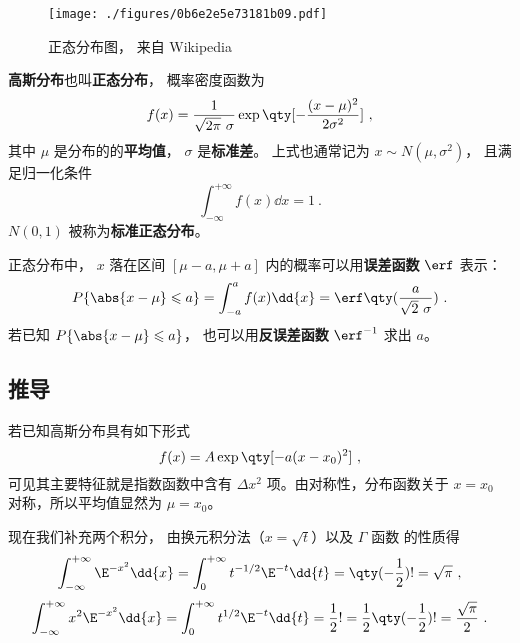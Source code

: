 
\begin{issues}
\issueTODO
\end{issues}


\begin{figure}[ht]
\centering
\texttt{[image: ./figures/0b6e2e5e73181b09.pdf]}
\caption{正态分布图， 来自 Wikipedia} \label{fig_GausPD_1}
\end{figure}

\textbf{高斯分布}也叫\textbf{正态分布}， 概率密度函数为
\begin{equation}\label{eq_GausPD_1}
f(x) = \frac{1}{\sqrt{2\pi}\ \sigma} \exp\qty[-\frac{(x - \mu )^2}{2\sigma ^2}]~,
\end{equation}
其中 $\mu$ 是分布的的\textbf{平均值}， $\sigma$ 是\textbf{标准差}。 上式也通常记为 $x \sim N(\mu,\sigma^2)$， 且满足归一化条件
\begin{equation}\label{eq_GausPD_7}
\int_{-\infty}^{+\infty} f(x) \dd{x} = 1~.
\end{equation}
$N(0,1)$ 被称为\textbf{标准正态分布}。

正态分布中， $x$ 落在区间 $[\mu-a,\mu+a]$ 内的概率可以用\textbf{误差函数} $\erf$ 表示：
\begin{equation}
P\{\abs{x-\mu} \leqslant a\} = \int_{-a}^a f(x)\dd{x} = \erf\qty(\frac{a}{\sqrt{2}\ \sigma})~.
\end{equation}
若已知 $P\{\abs{x-\mu} \leqslant a\}$， 也可以用\textbf{反误差函数} $\erf^{-1}$ 求出 $a$。


\subsection{推导}
若已知高斯分布具有如下形式
\begin{equation}\label{eq_GausPD_2}
f(x) = A\exp\qty[-a (x - x_0)^2]~,
\end{equation}
可见其主要特征就是指数函数中含有 $\Delta x^2$ 项。由对称性，分布函数关于 $x =x_0$ 对称，所以平均值显然为 $\mu = x_0$。

现在我们补充两个积分， 由换元积分法（$x=\sqrt{t}$）以及 $\Gamma$ 函数 的性质得
\begin{equation}\label{eq_GausPD_3}
\int_{-\infty }^{+\infty } \E^{-x^2}\dd{x}  = \int_0^{+\infty} t^{-1/2}\E^{ - t} \dd{t}  = \qty(-\frac12)! = \sqrt \pi ~,
\end{equation}
\begin{equation}\label{eq_GausPD_4}
\int_{-\infty}^{+\infty} x^2 \E^{-x^2}\dd{x}  = \int_0^{+\infty} t^{1/2}\E^{-t} \dd{t}  = \frac12 ! = \frac12 \qty(-\frac12)! = \frac{\sqrt\pi}{2}~.
\end{equation}

